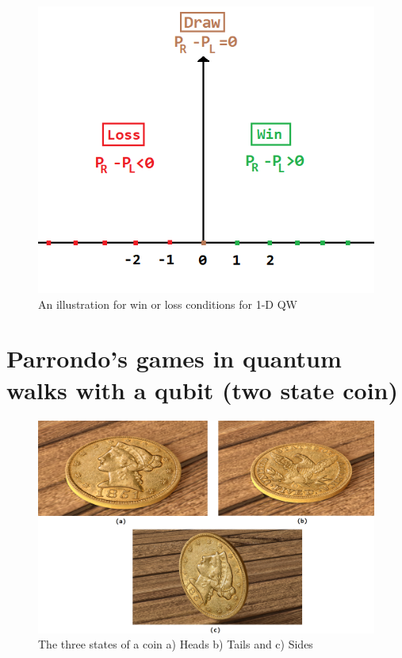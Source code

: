 \documentclass[english,aps,pra,amsmath,amssymb,showpacs,notitlepage,onecolumn]{revtex4-1}
\begin{document}
\begin{figure}[t]
\centering
\includegraphics[scale =0.5]{winloss.png}
\caption{An illustration for win or loss conditions for 1-D QW}
\label{fig:win-loss}
\end{figure}

\section{Parrondo's games in quantum walks with a qubit (two state coin)}\label{2state}
\begin{figure}
\includegraphics[scale=0.45]{coin.png}
 \caption{ The three states of a coin a) Heads b) Tails and c) Sides}\label{classical_coin}
\end{figure}
\end{document}
